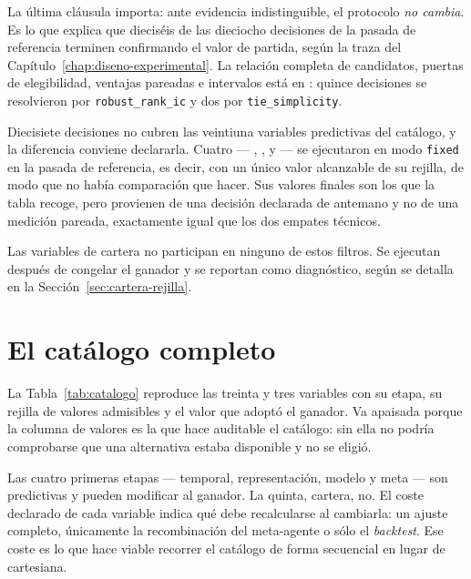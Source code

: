 La última cláusula importa: ante evidencia indistinguible, el protocolo \emph{no cambia}. Es lo que
explica que dieciséis de las dieciocho decisiones de la pasada de referencia terminen confirmando
el valor de partida, según la traza del Capítulo~\ref{chap:diseno-experimental}. La relación
completa de candidatos, puertas de elegibilidad, ventajas pareadas e intervalos está en
: quince decisiones se resolvieron por \texttt{robust\_rank\_ic} y dos por
\texttt{tie\_simplicity}.

Diecisiete decisiones no cubren las veintiuna variables predictivas del catálogo, y la diferencia
conviene declararla. Cuatro --- , ,
 y  --- se ejecutaron en modo
\texttt{fixed} en la pasada de referencia, es decir, con un único valor alcanzable de su rejilla, de
modo que no había comparación que hacer. Sus valores finales son los que la tabla recoge, pero
provienen de una decisión declarada de antemano y no de una medición pareada, exactamente igual que
los dos empates técnicos.

Las variables de cartera no participan en ninguno de estos filtros. Se ejecutan después de congelar
el ganador y se reportan como diagnóstico, según se detalla en la
Sección~\ref{sec:cartera-rejilla}.

\section{El catálogo completo}

La Tabla~\ref{tab:catalogo} reproduce las treinta y tres variables con su etapa, su rejilla de
valores admisibles y el valor que adoptó el ganador. Va apaisada porque la columna de valores es la
que hace auditable el catálogo: sin ella no podría comprobarse que una alternativa estaba disponible
y no se eligió.

\begin{landscape}

\end{landscape}

Las cuatro primeras etapas --- temporal, representación, modelo y meta --- son predictivas y pueden
modificar al ganador. La quinta, cartera, no. El coste declarado de cada variable indica qué debe
recalcularse al cambiarla: un ajuste completo, únicamente la recombinación del meta-agente o sólo el
\textit{backtest}. Ese coste es lo que hace viable recorrer el catálogo de forma secuencial en lugar
de cartesiana.

